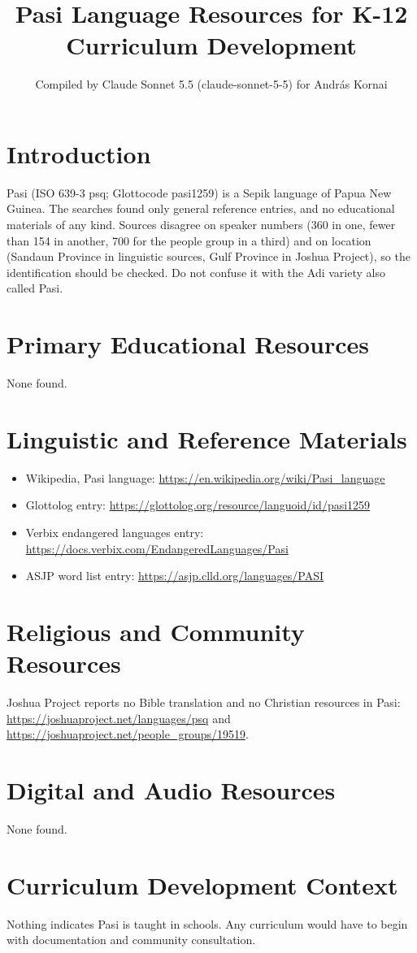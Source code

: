 \documentclass[12pt]{article}
\title{Pasi Language Resources for K-12 Curriculum Development}
\author{Compiled by Claude Sonnet 5.5 (claude-sonnet-5-5) for Andr\'as Kornai}
\date{}
\begin{document}
\maketitle

\section{Introduction}
Pasi (ISO 639-3 psq; Glottocode pasi1259) is a Sepik language of Papua New Guinea. The searches found only general reference entries, and no educational materials of any kind. Sources disagree on speaker numbers (360 in one, fewer than 154 in another, 700 for the people group in a third) and on location (Sandaun Province in linguistic sources, Gulf Province in Joshua Project), so the identification should be checked. Do not confuse it with the Adi variety also called Pasi.

\section{Primary Educational Resources}
None found.

\section{Linguistic and Reference Materials}
\begin{itemize}
\item Wikipedia, Pasi language: \url{https://en.wikipedia.org/wiki/Pasi_language}
\item Glottolog entry: \url{https://glottolog.org/resource/languoid/id/pasi1259}
\item Verbix endangered languages entry: \url{https://docs.verbix.com/EndangeredLanguages/Pasi}
\item ASJP word list entry: \url{https://asjp.clld.org/languages/PASI}
\end{itemize}

\section{Religious and Community Resources}
Joshua Project reports no Bible translation and no Christian resources in Pasi: \url{https://joshuaproject.net/languages/psq} and \url{https://joshuaproject.net/people_groups/19519}.

\section{Digital and Audio Resources}
None found.

\section{Curriculum Development Context}
Nothing indicates Pasi is taught in schools. Any curriculum would have to begin with documentation and community consultation.
\end{document}
